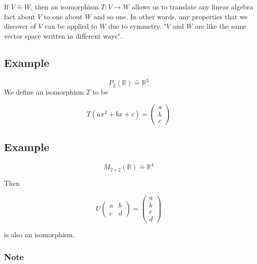 \documentclass{article}
\newtheorem{one minute paper}[theorem]{One Minute Paper}
\begin{document}
If $V \overset{\sim}{=} W$, then an isomorphism $T: V \rightarrow W$ allows us to translate any linear algebra fact about $V$ to one about $W$ and so one. In other words, any 
properties that we discover of $V$ can be applied to $W$ due to symmetry. "$V$ and $W$ are like the same vector space written in different ways". 

\subsection*{Example}

\begin{equation}
    P_2(\mathbb{R}) \overset{\sim}{=} \mathbb{R}^3
\end{equation}
We define an isomorphism $T$ to be 

\begin{equation}
    T(ax^2 + bx + c) = \begin{pmatrix}
        a \\
        b \\
        c
    \end{pmatrix}
\end{equation}

\subsection*{Example}

\begin{equation}
    M_{2\times 2}(\mathbb{R}) \overset{\sim}{=} \mathbb{R}^4
\end{equation}

Then 

\begin{equation}
    U\begin{pmatrix}
        a & b \\
        c & d
    \end{pmatrix} = \begin{pmatrix}
        a \\
        b\\
        c\\
        d
    \end{pmatrix}
\end{equation}

is also an isomorphism. 

\subsubsection*{Note}
\end{document}
